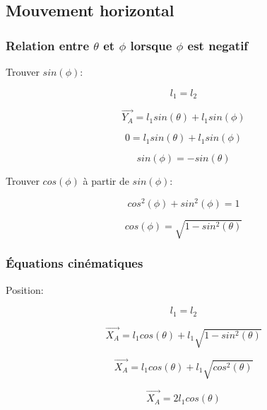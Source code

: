 \documentclass{article}
\begin{document}
\newpage
\subsection{Mouvement horizontal}
\subsubsection{Relation entre $\theta$ et $\phi$ lorsque $\phi$ est negatif}
\noindent Trouver $sin(\phi)$:

\begin{equation}
l_1 = l_2
\end{equation}

\begin{equation}
\overrightarrow{Y_A} = l_1sin(\theta)+l_1sin(\phi)
\end{equation}

\begin{equation}
0 = l_1sin(\theta)+l_1sin(\phi)
\end{equation}

\begin{equation}
sin(\phi) = -sin(\theta)
\end{equation}

\noindent Trouver $cos(\phi)$ à partir de $sin(\phi)$:

\begin{equation}
cos^2(\phi)+sin^2(\phi) = 1
\end{equation}

\begin{equation}
cos(\phi) = \sqrt{1-sin^2(\theta)}
\end{equation}

\subsubsection{Équations cinématiques}
\noindent Position:

\begin{equation}
l_1 = l_2
\end{equation}

\begin{equation}
\overrightarrow{X_A} = l_1cos(\theta)+l_1\sqrt{1-sin^2(\theta)}
\end{equation}

\begin{equation}
\overrightarrow{X_A} = l_1cos(\theta)+l_1\sqrt{cos^2(\theta)}
\end{equation}

\begin{equation}
\overrightarrow{X_A} = 2l_1cos(\theta)
\end{equation}
\end{document}
